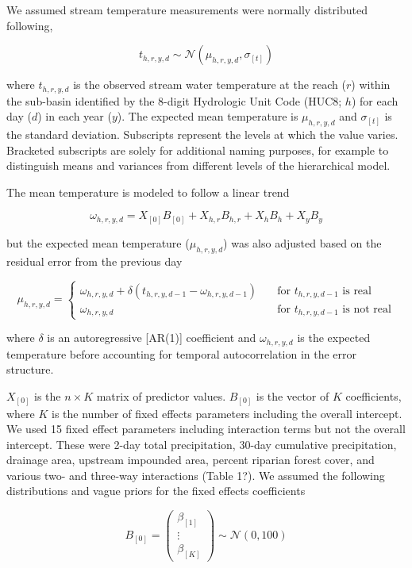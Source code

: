 We assumed stream temperature measurements were normally distributed
following,

\[ t_{h,r,y,d} \sim \mathcal{N}(\mu_{h,r,y,d}, \sigma_{[t]}) \]

where \(t_{h,r,y,d}\) is the observed stream water temperature at the
reach (\(r\)) within the sub-basin identified by the 8-digit Hydrologic
Unit Code (HUC8; \(h\)) for each day (\(d\)) in each year (\(y\)). The
expected mean temperature is \(\mu_{h,r,y,d}\) and \(\sigma_{[t]}\) is
the standard deviation. Subscripts represent the levels at which the
value varies. Bracketed subscripts are solely for additional naming
purposes, for example to distinguish means and variances from different
levels of the hierarchical model.

The mean temperature is modeled to follow a linear trend

\[ \omega_{h,r,y,d} = X_{[0]} B_{[0]} + X_{h,r} B_{h,r} + X_{h} B_{h} + X_{y} B_{y} \]

but the expected mean temperature (\(\mu_{h,r,y,d}\)) was also adjusted
based on the residual error from the previous day

\[ \mu_{h,r,y,d} = \begin{cases}
    \omega_{h,r,y,d} + \delta(t_{h,r,y,d-1} - \omega_{h,r,y,d-1}) & \quad  \text{for $t_{h,r,y,d-1}$ is real} \\
    \omega_{h,r,y,d} & \quad  \text{for $t_{h,r,y,d-1}$ is not real}
  \end{cases}
 \]

where \(\delta\) is an autoregressive {[}AR(1){]} coefficient and
\(\omega_{h,r,y,d}\) is the expected temperature before accounting for
temporal autocorrelation in the error structure.

\(X_{[0]}\) is the \(n \times K\) matrix of predictor values.
\(B_{[0]}\) is the vector of \(K\) coefficients, where \(K\) is the
number of fixed effects parameters including the overall intercept. We
used 15 fixed effect parameters including interaction terms but not the
overall intercept. These were 2-day total precipitation, 30-day
cumulative precipitation, drainage area, upstream impounded area,
percent riparian forest cover, and various two- and three-way
interactions (Table 1?). We assumed the following distributions and
vague priors for the fixed effects coefficients

\[ 
B_{[0]} = \left( \begin{array}{c} \beta_{[1]} \\ \vdots \\ \beta_{[K]} \end{array} \right) \sim \mathcal{N}(0, 100) 
\]

